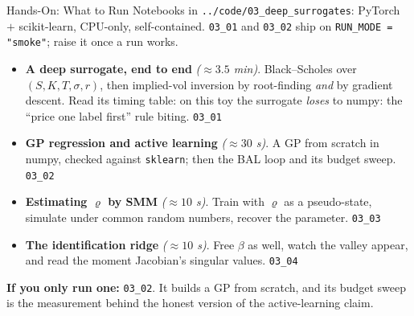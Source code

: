 \documentclass[aspectratio=169,11pt]{beamer}
\newcommand{\emphc}[1]{\textcolor{harvardcrimson}{#1}}
\begin{document}
\begin{frame}{Hands-On: What to Run}
\small
Notebooks in \texttt{../code/03\_deep\_surrogates}: PyTorch $+$ scikit-learn, CPU-only, self-contained. \texttt{03\_01} and \texttt{03\_02} ship on \texttt{RUN\_MODE = "smoke"}; raise it once a run works.

\vspace{0.15cm}
\begin{itemize}\itemsep4pt
  \item \textbf{A deep surrogate, end to end} \emph{(${\approx}3.5$ min)}. Black--Scholes over $(S, K, T, \sigma, r)$, then implied-vol inversion by root-finding \emph{and} by gradient descent. \emphc{Read its timing table:} on this toy the surrogate \emph{loses} to numpy: the ``price one label first'' rule biting. \hfill{\footnotesize\texttt{03\_01}}
  \item \textbf{GP regression and active learning} \emph{(${\approx}30$ s)}. A GP from scratch in numpy, checked against \texttt{sklearn}; then the BAL loop and its budget sweep. \hfill{\footnotesize\texttt{03\_02}}
  \item \textbf{Estimating $\varrho$ by SMM} \emph{(${\approx}10$ s)}. Train with $\varrho$ as a pseudo-state, simulate under common random numbers, recover the parameter. \hfill{\footnotesize\texttt{03\_03}}
  \item \textbf{The identification ridge} \emph{(${\approx}10$ s)}. Free $\beta$ as well, watch the valley appear, and read the moment Jacobian's singular values. \hfill{\footnotesize\texttt{03\_04}}
\end{itemize}

\vspace{0.15cm}
{\footnotesize \textbf{If you only run one:} \texttt{03\_02}. It builds a GP from scratch, and its budget sweep is the measurement behind the honest version of the active-learning claim.}
\end{frame}
\end{document}
